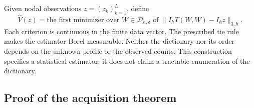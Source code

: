 Given nodal observations $z=(z_k)_{k=1}^L$, define
\begin{equation}\label{eq:v10-estimator}
 \widehat V(z)=\text{the first minimizer over }W\in\mathcal D_{h,\delta}
       \text{ of }\|I_hT(W,W)-I_hz\|_{3,h}.
\end{equation}
Each criterion is continuous in the finite data vector. The prescribed
tie rule makes the estimator Borel measurable. Neither the dictionary
nor its order depends on the unknown profile or the observed counts.
This construction specifies a statistical estimator; it does not
claim a tractable enumeration of the dictionary.

\subsection{Proof of the acquisition theorem}
